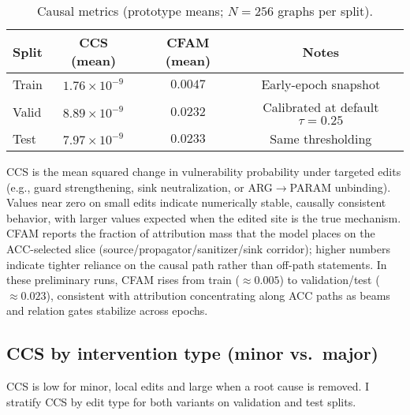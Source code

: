 \documentclass{buthesis}
\begin{document}
\begin{table}[H]
\centering
\small
\setlength{\tabcolsep}{8pt}
\renewcommand{\arraystretch}{1.10}
\caption{Causal metrics (prototype means; $N{=}256$ graphs per split).}
\label{tab:results-causal-proto}
\begin{tabular}{lccc}
\toprule
\textbf{Split} & \textbf{CCS (mean)} & \textbf{CFAM (mean)} & \textbf{Notes} \\
\midrule
Train & $1.76\!\times\!10^{-9}$ & $0.0047$ & Early-epoch snapshot \\
Valid & $8.89\!\times\!10^{-9}$ & $0.0232$ & Calibrated at default $\tau{=}0.25$ \\
Test  & $7.97\!\times\!10^{-9}$ & $0.0233$ & Same thresholding \\
\bottomrule
\end{tabular}
\end{table}

\noindent CCS is the mean squared change in vulnerability probability under targeted edits (e.g., guard strengthening, sink neutralization, or ARG$\!\to$PARAM unbinding). Values near zero on small edits indicate numerically stable, causally consistent behavior, with larger values expected when the edited site is the true mechanism. CFAM reports the fraction of attribution mass that the model places on the ACC-selected slice (source/propagator/sanitizer/sink corridor); higher numbers indicate tighter reliance on the causal path rather than off-path statements. In these preliminary runs, CFAM rises from train ($\approx0.005$) to validation/test ($\approx0.023$), consistent with attribution concentrating along ACC paths as beams and relation gates stabilize across epochs.



\subsection{CCS by intervention type (minor vs.\ major)}
\label{subsec:ccs-types}

CCS is low for minor, local edits and large when a root cause is removed. I stratify CCS by edit type for both variants on validation and test splits.
\end{document}

